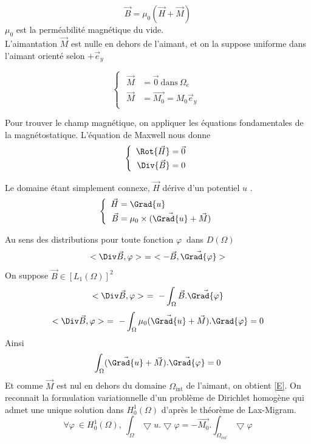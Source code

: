 \documentclass[a4paper,12pt,titlepage]{report}
\begin{document}
\begin{onehalfspace}
\[\vec{B}=\mu _{0}(\vec{H}+\vec{M})\]
$\mu _{0}$ est la perméabilité magnétique du vide. \\
L'aimantation $\vec{M}$ est nulle en dehors de l'aimant, et on la suppose uniforme dans l'aimant orienté selon $+\vec{e}_y$
 
\[ 
\left\{
\begin{array}{ccc}
\begin{aligned}
	\vec{M} &= \vec{0} \  \text{dans} \ \Omega_{e} \\ 
	\vec{M} &= \vec{M_{0}} = M_0 \vec{e}_y
\end{aligned}
\end{array}
\right.
\]

Pour trouver le champ magnétique, on appliquer les équations fondamentales de la magnétostatique. L'équation de Maxwell nous donne 
\[
	\left\{
	\begin{array}{ccc}
	\begin{aligned}
		\Rot{\vec{H}} &= \vec {0} \\
		\Div{\vec{B}} &= 0
	\end{aligned}
	\end{array}
	\right.
\]

Le domaine étant simplement connexe, $\vec{H}$ dérive d'un potentiel $u$	.
\[
	\left\{
	\begin{array}{ccc}		
	\begin{aligned}
		\vec{H} &= \Grad{u} \\
		\vec{B} &= \mu_{0}\times(\vec{\Grad{u}}+\vec{M})
	\end{aligned}
	\end{array}
	\right.
\]

Au sens des distributions pour toute fonction $\varphi\ $  dans $D(\Omega)$	
\[<\Div\vec{B},\varphi> \ = \ <-\vec{B},\vec{\Grad{\varphi}}>\]
On suppose $\vec{B} \in [L_{1}(\Omega)]^2$
\[<\Div\vec{B},\varphi> \ = \  -\int_{\Omega}\vec{B}. \vec{\Grad{\varphi}}\]
\[<\Div\vec{B},\varphi> \ = \ -\int_{\Omega}\mu_{0}(\vec{\Grad{u}}+\vec{M}) .{\Grad{\varphi}} = 0\]
Ainsi
\[\int_{\Omega}(\vec{\Grad{u}}+\vec{M}) . \vec{\Grad{\varphi}} = 0\]
Et comme $\vec{M}$ est nul en dehors du domaine $\Omega_{\text{int}}$ de l'aimant, on obtient \ref{E}.
On reconnait la formulation variationnelle d'un problème de Dirichlet homogène qui admet une unique solution dans $H_{0}^{1}(\Omega)$ d'après le théorème de Lax-Migram.
\begin{equation}
\label{E}
\forall \varphi\ \in H_{0}^{1}(\Omega), \ \int_{\Omega}\bigtriangledown u .\bigtriangledown{\varphi} = -\vec{M_{0}}. \int_{\Omega_{int}}\bigtriangledown\varphi
\end{equation}


\end{onehalfspace}
\end{document}
